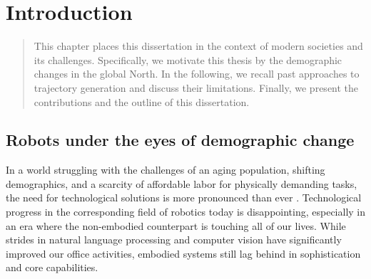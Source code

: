 \chapter{Introduction} %
\label{cha:Introduction}


\begin{abstract}
This chapter places this dissertation in the context of
modern societies and its challenges. Specifically, we
motivate this thesis by the demographic changes in the
global North. In the following, we recall past approaches to
trajectory generation and discuss their limitations.
Finally, we present the contributions and the outline of
this dissertation.
\end{abstract}

\newpage


\section{Robots under the eyes of demographic change}

In a world struggling with the challenges of an aging
population, shifting demographics, and a scarcity of
affordable labor for physically demanding tasks, the need
for technological solutions is more pronounced than ever
\cite{ince2015economic}.
Technological progress in the corresponding field of
robotics today is disappointing, especially in an era where
the non-embodied counterpart is touching all of our lives.
While strides in natural language processing and computer
vision have significantly improved our office activities,
embodied systems still lag behind in sophistication and core
capabilities.

